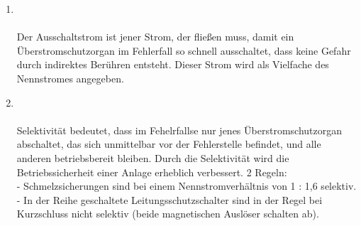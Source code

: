 \begin{enumerate}
    \item   {} \\\\
            Der Ausschaltstrom ist jener Strom, der fließen muss, damit ein Überstromschutzorgan im Fehlerfall so schnell ausschaltet, dass keine Gefahr durch indirektes Berühren entsteht.
            Dieser Strom wird als Vielfache des Nennstromes angegeben.

    \item   {} \\\\
            Selektivität bedeutet, dass im Fehelrfallse nur jenes Überstromschutzorgan abschaltet, das sich unmittelbar vor der Fehlerstelle befindet, und alle anderen betriebsbereit bleiben.
            Durch die Selektivität wird die Betriebssicherheit einer Anlage erheblich verbessert.
            2 Regeln: \\
            - Schmelzsicherungen sind bei einem Nennstromverhältnis von 1 : 1,6 selektiv. \\
            - In der Reihe geschaltete Leitungsschutzschalter sind in der Regel bei Kurzschluss nicht selektiv (beide magnetischen Auslöser schalten ab).  
\end{enumerate}